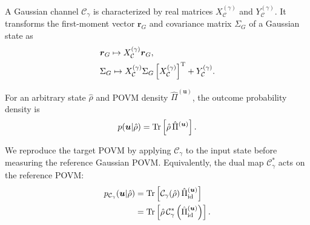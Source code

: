 \documentclass[%
final, 
superscriptaddress,
 amsmath,amssymb,amsfonts,
 aps,
 pra,
 longbibliography,
]{revtex4-2}
\newcommand{\Tr}{\mathop{\rm Tr}\nolimits}
\newcommand{\ind}[1]{\mathrm{#1}}
\begin{document}
A Gaussian channel $\mathcal{C}_{\gamma}$ is characterized by real matrices $X_{\mathcal{C}}^{(\gamma)}$ and $Y_{\mathcal{C}}^{(\gamma)}$. It transforms the first-moment vector $\boldsymbol{r}_G$ and covariance matrix $\Sigma_G$ of a Gaussian state as~\cite{Weed:rmp:2012}
\begin{align}
  &\boldsymbol{r}_G
  \mapsto
  X_{\mathcal{C}}^{(\gamma)}\boldsymbol{r}_G,
  \notag\\
  \label{eq:X,Y-action}
  &\Sigma_G
  \mapsto
  X_{\mathcal{C}}^{(\gamma)}
  \Sigma_G
  \left[X_{\mathcal{C}}^{(\gamma)}\right]^{\ind{T}}
  +Y_{\mathcal{C}}^{(\gamma)}.
\end{align}

For an arbitrary state $\hat{\rho}$ and POVM density
$\hat{\Pi}^{(\boldsymbol{u})}$, the outcome probability density
is~\cite{Nielsen:bk:2010}
\begin{align}
  p(\boldsymbol{u}|\hat{\rho})
  =
  \Tr\left[
    \hat{\rho}\,
    \hat{\Pi}^{(\boldsymbol{u})}
  \right].
\end{align}

We reproduce the target POVM by applying $\mathcal{C}_{\gamma}$ to the input state before measuring the reference Gaussian POVM. Equivalently, the dual map $\mathcal{C}_{\gamma}^{*}$ acts on the reference POVM:
\begin{align}
  \label{eq:channel-motiv}
  p_{\mathcal{C}_{\gamma}}(\boldsymbol{u}|\hat{\rho})
  &=
  \Tr\left[
    \mathcal{C}_{\gamma}(\hat{\rho})\,
    \hat{\Pi}_{\ind{id}}^{(\boldsymbol{u})}
  \right]
  \notag\\
  &=
  \Tr\left[
    \hat{\rho}\,
    \mathcal{C}_{\gamma}^{*}
    \left(
      \hat{\Pi}_{\ind{id}}^{(\boldsymbol{u})}
    \right)
  \right].
\end{align}
\end{document}
